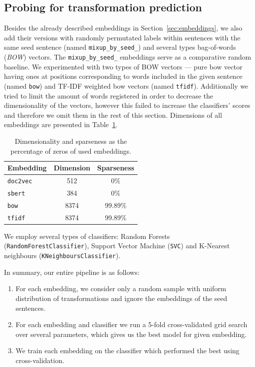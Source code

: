 \documentclass[11pt]{article}
\newcommand{\Embed}[1]{\texttt{#1}}
\newcommand{\Cls}[1]{\texttt{#1}}
\begin{document}
\subsection{Probing for transformation prediction}\label{sec:probing_results}

Besides the already described embeddings in Section~\ref{sec:embeddings}, we
also add their versions with randomly permutated labels within sentences with
the same seed sentence (named \Embed{mixup\_by\_seed\_}) and several types
bag-of-words (\emph{BOW}) vectors. The \Embed{mixup\_by\_seed\_} embeddings
serve as a comparative random baseline. We experimented with two types of BOW
vectors --- pure bow vector having ones at positions corresponding to words
included in the given sentence (named \Embed{bow}) and TF-IDF weighted bow
vectors (named \Embed{tfidf}). Additionally we tried to limit the amount of
words registered in order to decrease the dimensionality of the vectors,
however this failed to increase the classifiers' scores and therefore we omit
them in the rest of this section. Dimensions of all embeddings are presented in
Table~\ref{tab:embeddings_dim}.


\begin{table}[htp]
  \centering
  \begin{tabular}{l  c c}
    \toprule
    Embedding & Dimension & Sparseness\\
    \midrule
    \Embed{doc2vec} & 512 & 0\%\\
    \Embed{sbert} & 384 & 0\%\\
    \Embed{bow} & 8374 & 99.89\%\\
    \Embed{tfidf} & 8374 & 99.89\%\\
    \bottomrule
  \end{tabular}
  \caption{Dimensionality and sparseness as the percentage of zeros of used
  embeddings.}\label{tab:embeddings_dim}
\end{table}

We employ several types of classifiers: Random Forests
(\Cls{RandomForestClassifier}), Support Vector Machine (\Cls{SVC}) and
K-Nearest neighbours (\Cls{KNeighboursClassifier}).


In summary, our entire pipeline is as follows:
\begin{enumerate}
  \item For each embedding, we consider only a random sample with uniform
    distribution of transformations and ignore the embeddings of the seed
    sentences.
  \item For each embedding and classifier we run a 5-fold cross-validated grid
    search over several parameters, which gives us the best model for given
    embedding.
  \item We train each embedding on the classifier which performed the best
    using cross-validation.
\end{enumerate}
\end{document}
